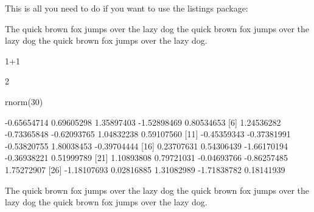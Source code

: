 \documentclass{article}\usepackage[]{graphicx}\usepackage[]{color}
\begin{document}
This is all you need to do if you want to use the listings package:



The quick brown fox jumps over the lazy dog the quick brown fox jumps over the
lazy dog the quick brown fox jumps over the lazy dog.

\begin{Schunk}
\begin{Sinput}
1+1
\end{Sinput}
\begin{Soutput}
[1] 2
\end{Soutput}
\begin{Sinput}
rnorm(30)
\end{Sinput}
\begin{Soutput}
 [1] -0.65654714  0.69605298  1.35897403 -1.52898469  0.80534653
 [6]  1.24536282 -0.73365848 -0.62093765  1.04832238  0.59107560
[11] -0.45359343 -0.37381991 -0.53820755  1.80038453 -0.39704444
[16]  0.23707631  0.54306439 -1.66170194 -0.36938221  0.51999789
[21]  1.10893808  0.79721031 -0.04693766 -0.86257485  1.75272907
[26] -1.18107693  0.02816885  1.31082989 -1.71838782  0.18141939
\end{Soutput}
\end{Schunk}

The quick brown fox jumps over the lazy dog the quick brown fox jumps over the
lazy dog the quick brown fox jumps over the lazy dog.
\end{document}
